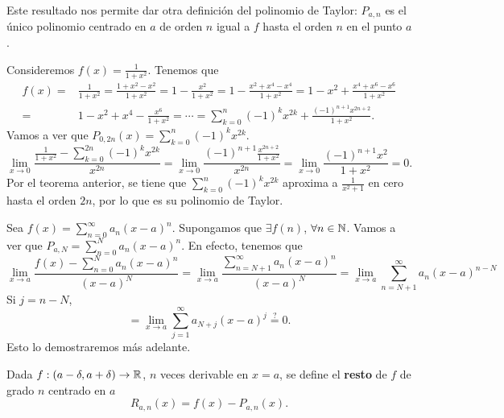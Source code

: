 \begin{observation}
\normalfont Este resultado nos permite dar otra definición del polinomio de Taylor: $\displaystyle P_{a,n} $ es el único polinomio centrado en $\displaystyle a $ de orden $\displaystyle n $ igual a $\displaystyle f $ hasta el orden $\displaystyle n $ en el punto $\displaystyle a $.
\end{observation}
\begin{eg}
\normalfont 
Consideremos $\displaystyle f\left(x\right) = \frac{1}{1 + x^{2}} $. Tenemos que 
	\[
	\begin{split}
		f\left(x\right) = & \frac{1}{1 + x^{2}} = \frac{1 +x^{2}-x^{2}}{1 + x^{2}} = 1 - \frac{x^{2}}{1 +x^{2}} = 1 - \frac{x^{2}+x^{4}-x^{4}}{1 +x^{2}} = 1 -x^{2} + \frac{x^{4}+x^{6}-x^{6}}{1 +x^{2}} \\
		= & 1 -x^{2}+x^{4}-\frac{x^{6}}{1 + x^{2}} = \cdots = \sum^{n}_{k=0}\left(-1\right)^{k}x^{2k} + \frac{\left(-1\right)^{n+1}x^{2n+2}}{1 +x^{2}}.
	\end{split}
	\]
Vamos a ver que $\displaystyle P_{0,2n}\left(x\right) = \sum^{n}_{k=0}\left(-1\right)^{k}x^{2k} $.
\[\lim_{x \to 0}\frac{\frac{1}{1+x^{2}}-\sum^{2n}_{k=0}\left(-1\right)^{k}x^{2k}}{x^{2n}} = \lim_{x \to 0}\frac{ \left(-1\right)^{n+1}\frac{x^{2n+2}}{1 +x^{2}}}{x^{2n}} = \lim_{x \to 0}\frac{\left(-1\right)^{n+1}x^{2}}{1+x^{2}} = 0 .\]
Por el teorema anterior, se tiene que $\displaystyle \sum^{n}_{k=0}\left(-1\right)^{k}x^{2k} $ aproxima a $\displaystyle \frac{1}{x^{2}+1} $ en cero hasta el orden $\displaystyle 2n $, por lo que es su polinomio de Taylor.
\end{eg}
\begin{eg}
\normalfont Sea $\displaystyle f\left(x\right) = \sum^{\infty}_{n=0}a_{n}\left(x-a\right)^{n}$. Supongamos que $\displaystyle \exists f\left(n\right)  $, $\displaystyle \forall n \in \mathbb{N} $. Vamos a ver que $\displaystyle P_{a,N} = \sum^{N}_{n=0}a_{n}\left(x-a\right)^{n} $. En efecto, tenemos que
\[\lim_{x \to a}\frac{f\left(x\right)-\sum^{N}_{n = 0}a_{n}\left(x-a\right)^{n}}{\left(x-a\right)^{N}} = \lim_{x \to a}\frac{\sum^{\infty}_{n = N+1}a_{n}\left(x-a\right)^{n}}{\left(x-a\right)^{N}} = \lim_{x \to a}\sum^{\infty}_{n = N+1}a_{n}\left(x-a\right)^{n - N} \]
Si $\displaystyle j = n - N $,
\[= \lim_{x \to a}\sum^{\infty}_{j=1}a_{N+j}\left(x-a\right)^{j} \stackrel{?}{=} 0 .\]
Esto lo demostraremos más adelante.
\end{eg}
\begin{fdefinition}[]
\normalfont Dada $\displaystyle f : \left(a-\delta, a + \delta \right)\to \mathbb{R} $, $\displaystyle n $ veces derivable en $\displaystyle x = a $, se define el \textbf{resto} de $\displaystyle f $ de grado $\displaystyle n $ centrado en $\displaystyle a $ 
\[R_{a,n}\left(x\right) = f\left(x\right)-P_{a,n}\left(x\right) .\]
\end{fdefinition}
